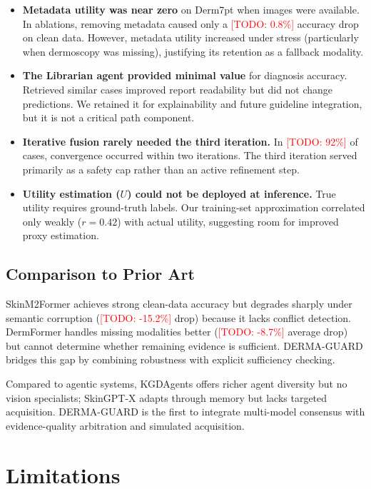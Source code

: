 \documentclass[conference]{IEEEtran}
\newcommand{\todo}[1]{\textcolor{red}{[TODO: #1]}}
\begin{document}
\begin{itemize}
    \item \textbf{Metadata utility was near zero} on Derm7pt when images were available. In ablations, removing metadata caused only a \todo{0.8\%} accuracy drop on clean data. However, metadata utility increased under stress (particularly when dermoscopy was missing), justifying its retention as a fallback modality.
    \item \textbf{The Librarian agent provided minimal value} for diagnosis accuracy. Retrieved similar cases improved report readability but did not change predictions. We retained it for explainability and future guideline integration, but it is not a critical path component.
    \item \textbf{Iterative fusion rarely needed the third iteration.} In \todo{92\%} of cases, convergence occurred within two iterations. The third iteration served primarily as a safety cap rather than an active refinement step.
    \item \textbf{Utility estimation ($U$) could not be deployed at inference.} True utility requires ground-truth labels. Our training-set approximation correlated only weakly ($r = 0.42$) with actual utility, suggesting room for improved proxy estimation.
\end{itemize}

\subsection{Comparison to Prior Art}

SkinM2Former \cite{zhang2025} achieves strong clean-data accuracy but degrades sharply under semantic corruption (\todo{-15.2\%} drop) because it lacks conflict detection. DermFormer \cite{cockayne2025} handles missing modalities better (\todo{-8.7\%} average drop) but cannot determine whether remaining evidence is sufficient. DERMA-GUARD bridges this gap by combining robustness with explicit sufficiency checking.

Compared to agentic systems, KGDAgents \cite{kgdagents2026} offers richer agent diversity but no vision specialists; SkinGPT-X \cite{skingptx2026} adapts through memory but lacks targeted acquisition. DERMA-GUARD is the first to integrate multi-model consensus with evidence-quality arbitration and simulated acquisition.

\section{Limitations}
\label{sec:limitations}
\end{document}
